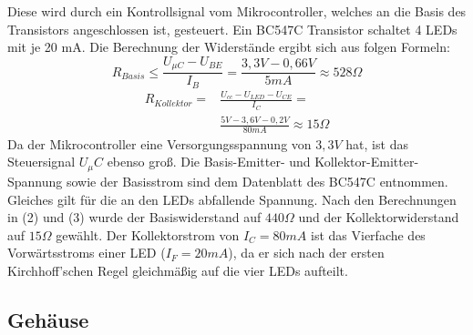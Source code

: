 \documentclass[journal, a4paper]{IEEEtran}
\begin{document}
			Diese wird durch ein Kontrollsignal vom Mikrocontroller, welches an die Basis des Transistors angeschlossen ist, gesteuert. Ein BC547C Transistor schaltet 4 LEDs mit je 20 mA. Die Berechnung der Widerstände ergibt sich aus folgen Formeln: 
			\begin{equation}
				R_{Basis} \leq \frac{U_{\mu C}-U_{BE}}{I_B} =  \frac{3,3V-0,66V}{5mA} \approx 528\Omega
			\end{equation}
			\begin{equation}
				\begin{split}
					R_{Kollektor} = & \frac{U_{cc}-U_{LED}-U_{CE}}{I_{C}} = \\ 
					&\frac{5V-3,6V-0,2V}{80mA} \approx 15\Omega
				\end{split}
			\end{equation}
			Da der Mikrocontroller eine Versorgungsspannung von $3,3V$ hat, ist das Steuersignal $U_\mu C$ ebenso groß. Die Basis-Emitter- und Kollektor-Emitter-Spannung sowie der Basisstrom sind dem Datenblatt des BC547C entnommen. Gleiches gilt für die an den LEDs abfallende Spannung. Nach den Berechnungen in (2) und (3) wurde der Basiswiderstand auf $440\Omega$ und der Kollektorwiderstand auf  $15\Omega$ gewählt.
			Der Kollektorstrom von $I_C=80mA$ ist das Vierfache des Vorwärtsstroms einer LED ($I_F=20mA$), da er sich nach der ersten Kirchhoff'schen Regel gleichmäßig auf die vier LEDs aufteilt.
		\subsection{Gehäuse}
\end{document}
